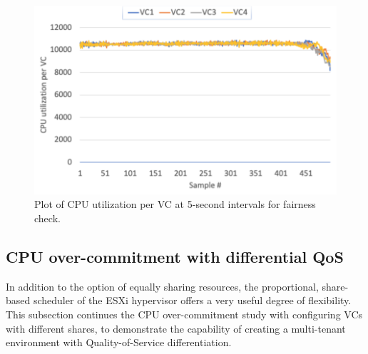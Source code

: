\begin{figure}[!t]
   \begin{center}
       \includegraphics[width=0.8\columnwidth]{Figures/per_cluster_utilization_4.pdf}
   \end{center}
   \caption{Plot of CPU utilization per VC at 5-second intervals for fairness check.}
   \label{fig:per_cluster_utilization}
\end{figure}

\subsection{CPU over-commitment with differential QoS}
In addition to the option of equally sharing resources, the proportional, share-based scheduler of the ESXi hypervisor offers a very useful degree of flexibility. This subsection continues the CPU over-commitment study with configuring VCs with different shares, to demonstrate the capability of creating a multi-tenant environment with Quality-of-Service differentiation. 

